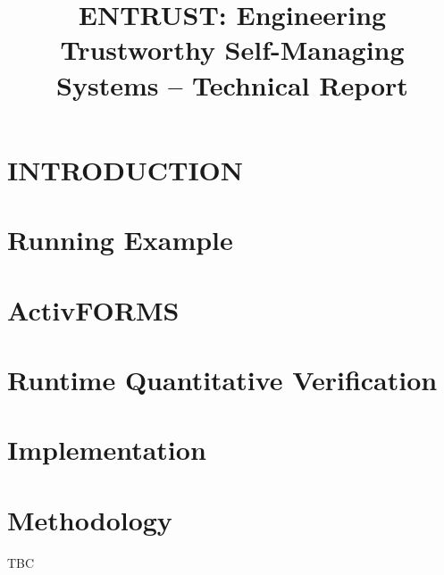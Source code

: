 \documentclass[a4paper]{llncs}
\newcommand{\approach}{ENTRUST}
\begin{document}
\title{\approach: Engineering Trustworthy Self-Managing Systems -- Technical Report}
\author{}
\institute{}
\maketitle


\section{INTRODUCTION} \label{sec:introduction}


\section{Running Example}\label{sec:example}


\section{ActivFORMS}\label{sec:activForms}


\section{Runtime Quantitative Verification}\label{sec:rqv}


\section{Implementation}\label{sec:implementation}


\section{Methodology}
TBC



\end{document}
